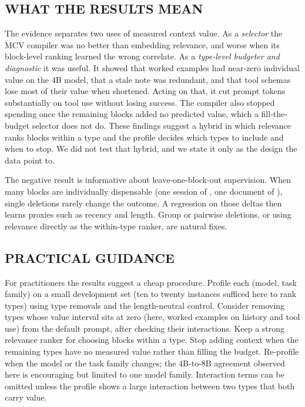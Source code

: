 \subsection{WHAT THE RESULTS MEAN}
The evidence separates two uses of measured context value. As a \emph{selector} the MCV compiler was no better than
embedding relevance, and worse when its block-level ranking learned the wrong correlate. As a \emph{type-level
budgeter and diagnostic} it was useful. It showed that worked examples had near-zero individual value on the 4B model, that a stale note
was redundant, and that tool schemas lose most of their value when shortened. Acting on that, it cut prompt tokens
substantially on tool use without losing success. The compiler also stopped spending once the remaining blocks added no predicted
value, which a fill-the-budget selector does not do. These findings suggest a hybrid in which relevance ranks
blocks within a type and the profile decides which types to include and when to stop. We did not test that hybrid, and
we state it only as the design the data point to.

The negative result is informative about leave-one-block-out supervision. When many blocks are individually
dispensable (one session of \RNumSessions, one document of \RNumDocs), single deletions rarely change the outcome. A
regression on those deltas then learns proxies such as recency and length. Group or pairwise deletions, or using
relevance directly as the within-type ranker, are natural fixes.

\subsection{PRACTICAL GUIDANCE}
For practitioners the results suggest a cheap procedure. Profile each (model, task family) on a small development set
(ten to twenty instances sufficed here to rank types) using type removals and the length-neutral control. Consider
removing types whose value interval sits at zero (here, worked examples on history and tool use) from the default
prompt, after checking their interactions. Keep a strong relevance
ranker for choosing blocks within a type. Stop adding context when the remaining types have no measured value rather than
filling the budget. Re-profile when the model or the task family changes; the 4B-to-8B agreement observed here is
encouraging but limited to one model family. Interaction terms can be omitted unless the profile shows a large
interaction between two types that both carry value.

